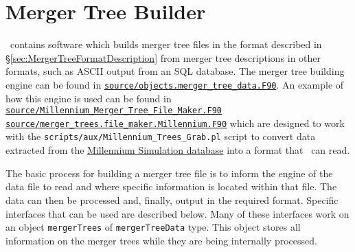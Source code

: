 \section{Merger Tree Builder}

\glc\ contains software which builds merger tree files in the format described in \S\ref{sec:MergerTreeFormatDescription} from merger tree descriptions in other formats, such as ASCII output from an SQL database. The merger tree building engine can be found in \hyperlink{objects.merger_tree_data.F90}{{\tt source/objects.merger\_tree\_data.F90}}. An example of how this engine is used can be found in \hyperlink{Millennium_Merger_Tree_File_Maker.F90}{{\tt source/Millennium\_Merger\_Tree\_File\_Maker.F90}} \hyperlink{merger_trees.file_maker.Millennium.F90}{{\tt source/merger\_trees.file\_maker.Millennium.F90}} which are designed to work with the {\tt scripts/aux/Millennium\_Trees\_Grab.pl} script to convert data extracted from the \href{http://www.g-vo.org/MyMillennium3/}{Millennium Simulation database} into a format that \glc\ can read.

The basic process for building a merger tree file is to inform the engine of the data file to read and where specific information is located within that file. The data can then be processed and, finally, output in the required format. Specific interfaces that can be used are described below. Many of these interfaces work on an object {\tt mergerTrees} of {\tt mergerTreeData} type. This object stores all information on the merger trees while they are being internally processed.

